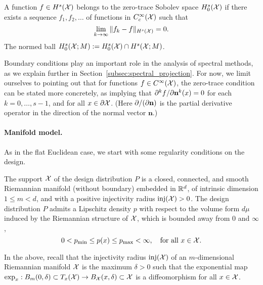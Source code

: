 \begin{definition}
	\label{def:zero_trace_sobolev_space}
	A function $f \in H^s(\mathcal{X})$ belongs to the zero-trace Sobolev space $H_0^s(\mathcal{X})$ if there exists a sequence $f_1,f_2,\ldots$ of functions in $C_c^{\infty}(\mathcal{X})$ such that
	\begin{equation*}
	\lim_{k \to \infty}\|f_k - f\|_{H^s(\mathcal{X})} = 0.
	\end{equation*}
	The normed ball $H_0^{s}(\mathcal{X};M) := H_0^{s}(\mathcal{X}) \cap H^{s}(\mathcal{X};M)$.
\end{definition}
Boundary conditions play an important role in the analysis of spectral methods, as we explain further in Section~\ref{subsec:spectral_projection}. For now, we limit ourselves to pointing out that for functions $f \in C^\infty(\mathcal{X})$, the zero-trace condition can be stated more concretely, as implying that $\partial^{k}f/\partial{\bf n}^k(x) = 0$ for each $k = 0,\ldots,s - 1$, and for all $x \in \partial\mathcal{X}$. (Here $\partial/(\partial {\bf n})$ is the partial derivative operator in the direction of the normal vector $\mathbf{n}$.)
\paragraph{Manifold model.}
As in the flat Euclidean case, we start with some regularity conditions on the design.
\begin{definition}
	\label{def:model_manifold}
	The support $\mathcal{X}$ of the design distribution $P$ is a closed, connected, and smooth Riemannian manifold (without boundary) embedded in $\mathbb{R}^d$, of intrinsic dimension $1 \leq m < d$, and with a positive injectivity radius $\mathrm{inj}(\mathcal{X}) > 0$. The design distribution $P$ admits a Lipschitz density $p$ with respect to the volume form $d\mu$ induced by the Riemannian structure of $\mathcal{X}$, which is bounded away from $0$ and $\infty$,
	\begin{equation*}
	0 < p_{\min} \leq p(x) \leq p_{\max} < \infty, \quad \textrm{for all $x \in \mathcal{X}$.}
	\end{equation*}
\end{definition}
In the above, recall that the injectivity radius $\mathrm{inj}(\mathcal{X})$ of an $m$-dimensional Riemannian manifold $\mathcal{X}$ is the maximum $\delta > 0$ such that the exponential map $\exp_x: B_m(0,\delta) \subset T_x(\mathcal{X}) \to B_{\mathcal{X}}(x,\delta) \subset \mathcal{X}$ is a diffeomorphism for all $x \in \mathcal{X}$.

